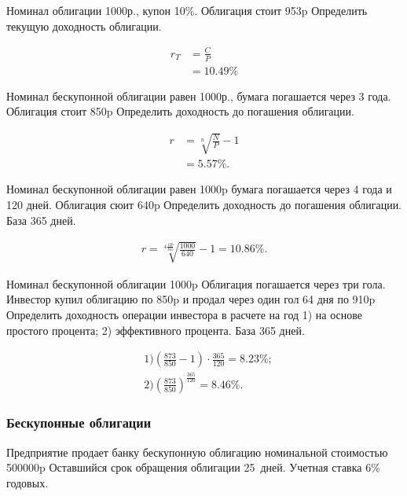 \documentclass[12pt, table, a4paper,twoside]{exam}
\begin{document}
\begin{questions}
\question[10] Номинал облигации 1000р., купон 10\%. Облигация стоит 953p Определить текущую доходность облигации.

\begin{solution}[12em]
	\begin{align}
	r_T&=\frac{C}{P}\\
	&=10.49\%\nonumber
	\end{align}
\end{solution}


\question[10] Номинал бескупонной облигации равен 1000р., бумага погашается через 3 года. Облигация стоит 850p Определить доходность до погашения облигации.

\begin{solution}[12em]
	\begin{align}
	r&=\sqrt[n]{\frac{N}{P}}-1\\
	&=5.57\%.
	\end{align}
\end{solution}


\question[10] Номинал бескупонной облигации равен 1000p бумага погашается через 4 года и 120 дней. Облигация сюит 640p Определить доходность до погашения облигации. База 365 дней.

\begin{solution}[12em]
	\begin{align*}
	r=\sqrt[4\frac{120}{365}]{\frac{1000}{640}} - 1 = 10.86\%.
	\end{align*}
\end{solution}



\question[10] Номинал бескупонной облигации 1000p Облигация погашается через три гола. Инвестор купил облигацию по 850p и продал через один гол 64 дня по 910p Определить доходность операции инвестора в расчете на год 1) на основе простого процента; 2) эффективного процента. База 365 дней.

\begin{solution}[12em]
	\begin{align*}
	&1) \left(\frac{873}{850} - 1 \right) \cdot \frac{365}{120}=8.23\%;\\
	&2) \left(\frac{873}{850} \right)^{\frac{365}{120}}=8.46\%.
	\end{align*}
\end{solution}

\subsubsection{Бескупонные облигации}
\question[10] Предприятие продает банку бескупонную облигацию номинальной стоимостью 500000p Оставшийся срок обращения облигации 25~дней. Учетная ставка 6\% годовых.


\end{questions}
\end{document}

